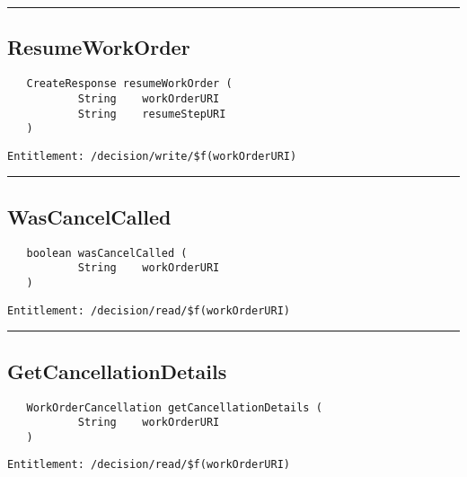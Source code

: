 \rule{12cm}{2pt}
\subsection{ResumeWorkOrder}
\label{Api:ResumeWorkOrder}
\begin{Verbatim}
   CreateResponse resumeWorkOrder (
           String    workOrderURI
           String    resumeStepURI
   )
\end{Verbatim}
\begin{Verbatim}[formatcom=\color{Maroon}]
  Entitlement: /decision/write/$f(workOrderURI)
\end{Verbatim}



\rule{12cm}{2pt}
\subsection{WasCancelCalled}
\label{Api:WasCancelCalled}
\begin{Verbatim}
   boolean wasCancelCalled (
           String    workOrderURI
   )
\end{Verbatim}
\begin{Verbatim}[formatcom=\color{Maroon}]
  Entitlement: /decision/read/$f(workOrderURI)
\end{Verbatim}



\rule{12cm}{2pt}
\subsection{GetCancellationDetails}
\label{Api:GetCancellationDetails}
\begin{Verbatim}
   WorkOrderCancellation getCancellationDetails (
           String    workOrderURI
   )
\end{Verbatim}
\begin{Verbatim}[formatcom=\color{Maroon}]
  Entitlement: /decision/read/$f(workOrderURI)
\end{Verbatim}



